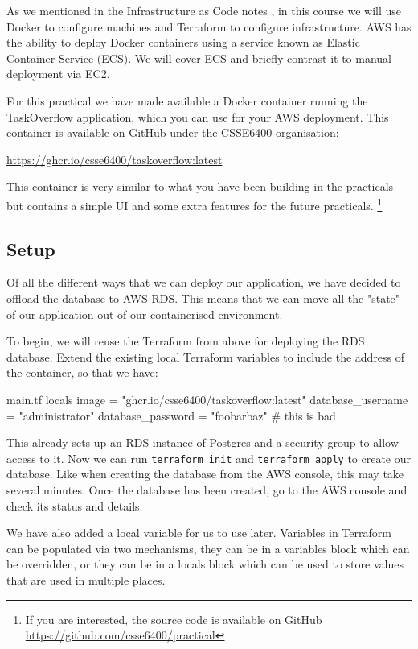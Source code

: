 \documentclass{csse4400}
\begin{document}
As we mentioned in the Infrastructure as Code notes \cite{iac-notes},
in this course we will use Docker to configure machines and Terraform to configure infrastructure.
AWS has the ability to deploy Docker containers using a service known as Elastic Container Service (ECS).
We will cover ECS and briefly contrast it to manual deployment via EC2.

For this practical we have made available a Docker container running the TaskOverflow application,
which you can use for your AWS deployment.
This container is available on GitHub under the CSSE6400 organisation:

\url{https://ghcr.io/csse6400/taskoverflow:latest}

This container is very similar to what you have been building in the practicals but contains a simple UI and some extra features for the future practicals.%
\footnote{If you are interested, the source code is available on GitHub \url{https://github.com/csse6400/practical}}

\subsection{Setup}

Of all the different ways that we can deploy our application, we have decided to offload the database to AWS RDS.
This means that we can move all the "state" of our application out of our containerised environment.

To begin, we will reuse the Terraform from above for deploying the RDS database.
Extend the existing local Terraform variables to include the address of the container, so that we have:

\begin{code}[language=terraform,numbers=none]{main.tf}
locals {
  image             = "ghcr.io/csse6400/taskoverflow:latest"
  database_username = "administrator"
  database_password = "foobarbaz" # this is bad
}
\end{code}

This already sets up an RDS instance of Postgres and a security group to allow access to it.
Now we can run \texttt{terraform init} and \texttt{terraform apply} to create our database.
Like when creating the database from the AWS console, this may take several minutes.
Once the database has been created, go to the AWS console and check its status and details.

We have also added a local variable for us to use later.
Variables in Terraform can be populated via two mechanisms,
they can be in a variables block which can be overridden,
or they can be in a locals block which can be used to store values that are used in multiple places.
\end{document}
